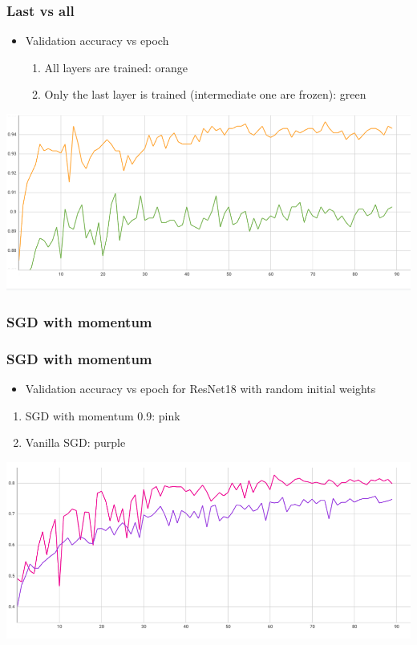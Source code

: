 \documentclass{beamer}
\begin{document}
\begin{frame}
    \frametitle{Last vs all}
\begin{itemize}
    \item Validation accuracy vs epoch
    \begin{enumerate}
        \item All layers are trained: orange
        \item Only the last layer is trained (intermediate one are frozen): green
    \end{enumerate}
\end{itemize}
    \includegraphics[width=\textwidth]{figs/last-vs-all.png}

\end{frame}

\begin{frame}
    \frametitle{SGD with momentum}

    

\end{frame}

\begin{frame}
    \frametitle{SGD with momentum}
    \begin{itemize}
        \item Validation accuracy vs epoch for ResNet18 with random initial weights
    \end{itemize}
    \begin{enumerate}
        \item SGD with momentum 0.9: pink
        \item Vanilla SGD: purple
    \end{enumerate}
\begin{center}
    \includegraphics[width=\textwidth]{figs/with-without-momentum.png}
\end{center}
    

\end{frame}
\end{document}
